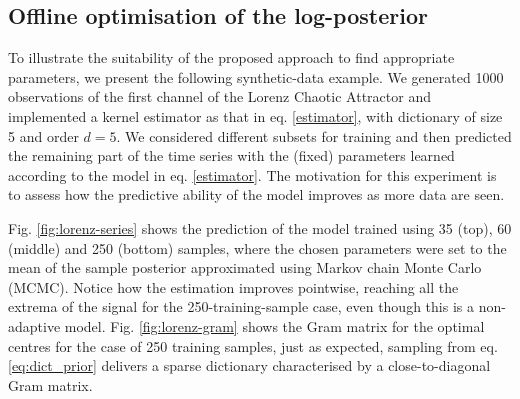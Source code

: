 \subsection{Offline optimisation of the log-posterior}
 



To illustrate the suitability of the proposed approach to find appropriate parameters, we present the following synthetic-data example. We generated 1000 observations of the first channel of the Lorenz Chaotic Attractor \cite{lorenz1963deterministic} and implemented a kernel estimator as that in eq. \eqref{estimator}, with dictionary of size 5 and order $d=5$. We considered different subsets for training and then predicted the remaining part of the time series with the (fixed) parameters learned according to the model in eq. \eqref{estimator}. The motivation for this experiment is to assess how the predictive ability of the  model improves as more data are seen. 

Fig. \ref{fig:lorenz-series} shows the prediction of the model trained using 35 (top), 60 (middle) and 250  (bottom) samples, where the chosen parameters were set to the mean of the sample posterior approximated using Markov chain Monte Carlo (MCMC). Notice how the estimation improves pointwise, reaching all the extrema of the signal for the 250-training-sample case, even though this is a non-adaptive model. Fig. \ref{fig:lorenz-gram} shows the Gram matrix for the optimal centres for the case of 250 training samples, just as expected, sampling from eq. \eqref{eq:dict_prior} delivers a sparse dictionary characterised by a close-to-diagonal Gram matrix.

